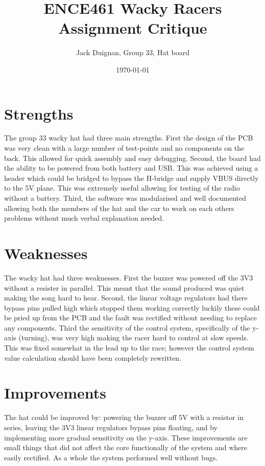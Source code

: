 \documentclass[a4paper,12pt]{article}
\title{ENCE461 Wacky Racers Assignment Critique}
\author{Jack Duignan, Group 33, Hat board}
\date{\today}
\begin{document}
\maketitle

\section{Strengths}

The group 33 wacky hat had three main strengths. First the design of the PCB was very clean with a large number of test-points and no components on the back. This allowed for quick assembly and easy debugging. Second, the board had the ability to be powered from both battery and USB. This was achieved using a header which could be bridged to bypass the H-bridge and supply VBUS directly to the 5V plane. This was extremely useful allowing for testing of the radio without a battery. Third, the software was modularised and well documented allowing both the members of the hat and the car to work on each others problems without much verbal explanation needed.

\section{Weaknesses}

The wacky hat had three weaknesses. First the buzzer was powered off the 3V3 without a resister in parallel. This meant that the sound produced was quiet making the song hard to hear. Second, the linear voltage regulators had there bypass pins pulled high which stopped them working correctly luckily these could be pried up from the PCB and the fault was rectified without needing to replace any components. Third the sensitivity of the control system, specifically of the y-axis (turning), was very high making the racer hard to control at slow speeds. This was fixed somewhat in the lead up to the race; however the control system value calculation should have been completely rewritten.

\section{Improvements}

The hat could be improved by: powering the buzzer off 5V with a resistor in series, leaving the 3V3 linear regulators bypass pins floating, and by implementing more gradual sensitivity on the y-axis. These improvements are small things that did not affect the core functionally of the system and where easily rectified. As a whole the system performed well without bugs.
\end{document}
